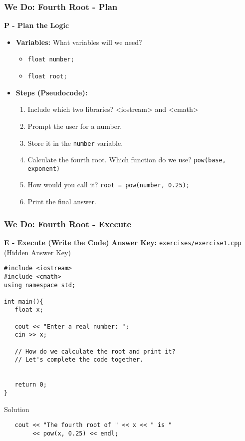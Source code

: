 \documentclass{beamer}
\begin{document}
\begin{frame}
\frametitle{We Do: Fourth Root - Plan}
\textbf{P - Plan the Logic}
\begin{itemize}
    \item \textbf{Variables:} What variables will we need?
    \begin{itemize}
        \item \pause \texttt{float number;}
        \item \pause \texttt{float root;}
    \end{itemize}
    \item \textbf{Steps (Pseudocode):}
    \begin{enumerate}
        \item Include which two libraries? \pause \alert{<iostream> and <cmath>}
        \item Prompt the user for a number.
        \item Store it in the \texttt{number} variable.
        \item Calculate the fourth root. Which function do we use? \pause \alert{\texttt{pow(base, exponent)}}
        \item How would you call it? \pause \alert{\texttt{root = pow(number, 0.25);}}
        \item Print the final answer.
    \end{enumerate}
\end{itemize}
\end{frame}

\begin{frame}[fragile]
\frametitle{We Do: Fourth Root - Execute}
\textbf{E - Execute (Write the Code)}
\textbf{Answer Key:} \texttt{exercises/exercise1.cpp} (Hidden Answer Key)
\begin{verbatim}
#include <iostream>
#include <cmath>
using namespace std;

int main(){
   float x;

   cout << "Enter a real number: ";
   cin >> x;

   // How do we calculate the root and print it?
   // Let's complete the code together.


   return 0;
}
\end{verbatim}
\pause
\begin{alertblock}{Solution}
\begin{verbatim}
   cout << "The fourth root of " << x << " is "
        << pow(x, 0.25) << endl;
\end{verbatim}
\end{alertblock}
\end{frame}
\end{document}
